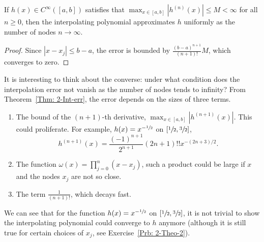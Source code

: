 \begin{corollary}
    If $h(x)\in C^{\infty}([a, b])$ satisfies that $\max_{x\in[a,b]} |h^{(n)}(x)|\le M <\infty$ for all $n\ge 0$, then the interpolating polynomial approximates $h$ uniformly as the number of nodes $n\to \infty$.
\end{corollary}
\begin{proof}
    Since $|x -x_j|\le b-a$, the error is bounded by $\frac{(b-a)^{n+1}}{(n+1)!} M$, which converges to zero.
\end{proof}
It is interesting to think about the converse: under what condition does the interpolation error not vanish as the number of nodes tends to infinity? From Theorem~\ref{Thm: 2-Int-err}, the error depends on the sizes of three terms. 
\begin{enumerate}
    \item The bound of the $(n+1)$-th derivative, $\max_{x\in[a,b]}|h^{(n+1)}(x)|$. This could proliferate. For example, $h(x) = x^{-\sfrac{1}{2}}$ on $[\sfrac{1}{2}, \sfrac{3}{2}]$,
    \begin{equation}
         h^{(n+1)}(x) = \frac{(-1)^{n+1}}{2^{n+1}} (2n+1)!! x^{-(2n+3)/2}.
    \end{equation}
    \item The function $\omega(x) = \prod_{j=0}^n (x - x_j)$, such a product could be large if $x$ and the nodes $x_j$ are not so close.
    \item The term $\frac{1}{(n+1)!}$, which decays fast.
\end{enumerate}
We can see that for the function $h(x) = x^{-\sfrac{1}{2}}$ on $[\sfrac{1}{2}, \sfrac{3}{2}]$, it is not trivial to show the interpolating polynomial could converge to $h$ anymore (although it is still true for certain choices of $x_j$, see Exercise~\ref{Prb: 2-Theo-2}). 

